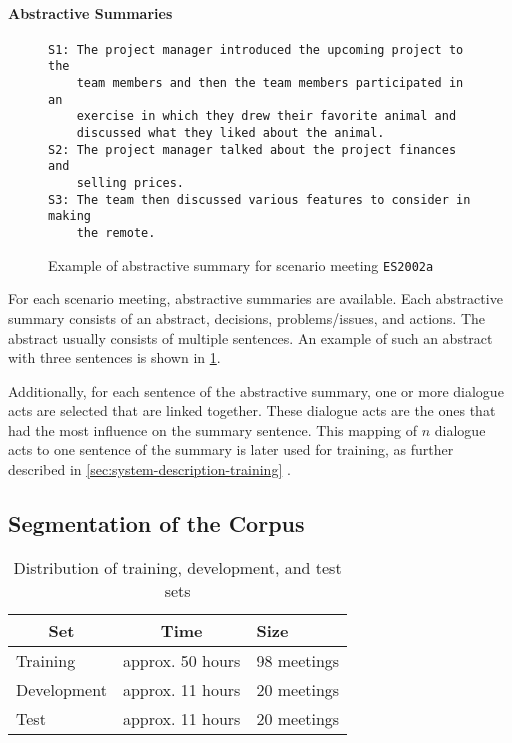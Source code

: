 \paragraph{Abstractive Summaries}

\begin{figure}[h]
\begin{lstlisting}[numbers=none]
S1: The project manager introduced the upcoming project to the 
    team members and then the team members participated in an
    exercise in which they drew their favorite animal and
    discussed what they liked about the animal.
S2: The project manager talked about the project finances and
    selling prices.
S3: The team then discussed various features to consider in making
    the remote.
\end{lstlisting}
\caption{Example of abstractive summary for scenario meeting \texttt{ES2002a}}
\label{fig:abstractive-summary-example}
\end{figure}

For each scenario meeting, abstractive summaries are available.
Each abstractive summary consists of an abstract, decisions, problems/issues, and actions.
The abstract usually consists of multiple sentences.
An example of such an abstract with three sentences is shown in \cref{fig:abstractive-summary-example}.

Additionally, for each sentence of the abstractive summary, one or more dialogue acts are selected that are linked together.
These dialogue acts are the ones that had the most influence on the summary sentence.
This mapping of $n$ dialogue acts to one sentence of the summary is later used for training, as further described in \cref{sec:system-description-training} \cite{amiWebsite}.

\subsection{Segmentation of the Corpus}\label{ssec:ami-segmentation-of-the-corpus}

\begin{table}[h]
\centering
\begin{tabular}{@{}lll@{}}
\toprule
\multicolumn{1}{c}{\textbf{Set}} & \multicolumn{1}{c}{\textbf{Time}} & \textbf{Size} \\ \midrule
Training                         & approx. 50 hours                  & 98 meetings   \\
Development                      & approx. 11 hours                  & 20 meetings   \\
Test                             & approx. 11 hours                  & 20 meetings   \\ \bottomrule
\end{tabular}
\caption[Distribution of train, dev and test sets]{Distribution of training, development, and test sets \cite{amiWebsite}}
\label{tab:meeting-time-distribution}
\end{table}

